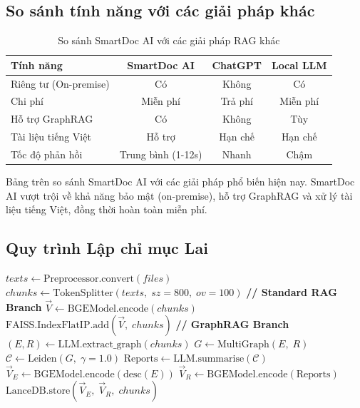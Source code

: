 \documentclass[10pt, conference, a4paper]{IEEEtran}
\begin{document}
\subsection{So sánh tính năng với các giải pháp khác}

\begin{table}[h]
\centering
\caption{So sánh SmartDoc AI với các giải pháp RAG khác}
\begin{tabular}{@{}lccc@{}}
\toprule
\textbf{Tính năng} & \textbf{SmartDoc AI} & \textbf{ChatGPT} & \textbf{Local LLM} \\
\midrule
Riêng tư (On-premise) & Có & Không & Có \\
Chi phí & Miễn phí & Trả phí & Miễn phí \\
Hỗ trợ GraphRAG & Có & Không & Tùy \\
Tài liệu tiếng Việt & Hỗ trợ & Hạn chế & Hạn chế \\
Tốc độ phản hồi & Trung bình (1-12s) & Nhanh & Chậm \\
\bottomrule
\end{tabular}
\label{tab:comparison}
\end{table}

Bảng trên so sánh SmartDoc AI với các giải pháp phổ biến hiện nay.
SmartDoc AI vượt trội về khả năng bảo mật (on-premise), hỗ trợ GraphRAG
và xử lý tài liệu tiếng Việt, đồng thời hoàn toàn miễn phí.

\subsection{Quy trình Lập chỉ mục Lai}

\begin{algorithm}[H]
\caption{Quy trình Lập chỉ mục Lai (Hybrid Indexing) cho SmartDoc AI}
\label{alg:index}
\begin{algorithmic}[1]
\small
{}
  \State $texts \gets \text{Preprocessor.convert}(files)$
  \State $chunks \gets \text{TokenSplitter}(texts,\;sz{=}800,\;ov{=}100)$
  \State \textbf{// Standard RAG Branch}
  \State $\vec{V} \gets \text{BGEModel.encode}(chunks)$
  \State $\text{FAISS.IndexFlatIP.add}(\vec{V},\; chunks)$
  \State \textbf{// GraphRAG Branch}
  \State $(E,R) \gets \text{LLM.extract\_graph}(chunks)$
  \State $G \gets \text{MultiGraph}(E,\; R)$
  \State $\mathcal{C} \gets \text{Leiden}(G,\;\gamma{=}1.0)$
  \State $\text{Reports} \gets \text{LLM.summarise}(\mathcal{C})$
  \State $\vec{V}_E \gets \text{BGEModel.encode}(\text{desc}(E))$
  \State $\vec{V}_R \gets \text{BGEModel.encode}(\text{Reports})$
  \State $\text{LanceDB.store}(\vec{V}_E,\;\vec{V}_R,\; chunks)$
\EndProcedure
\end{algorithmic}
\end{algorithm}
\end{document}
